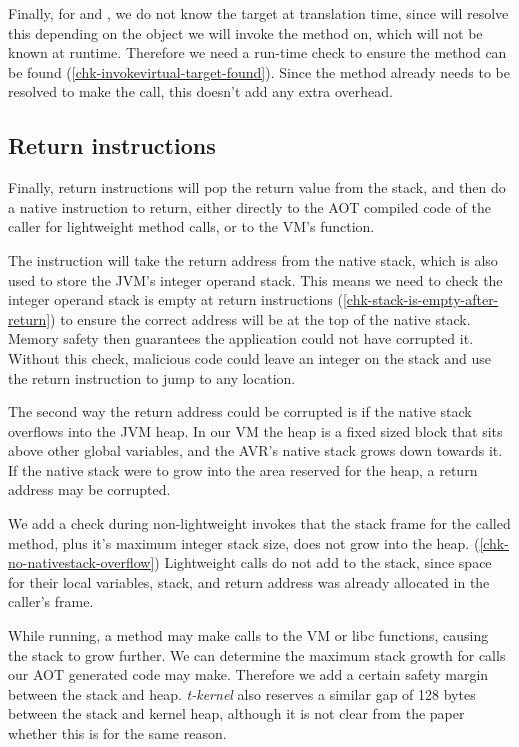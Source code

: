Finally, for  and , we do not know the target at translation time, since  will resolve this depending on the object we will invoke the method on, which will not be known at runtime. Therefore we need a run-time check to ensure the method can be found (\ref{chk-invokevirtual-target-found}). Since the method already needs to be resolved to make the call, this doesn't add any extra overhead.

\subsection{Return instructions}
Finally, return instructions will pop the return value from the stack, and then do a native  instruction to return, either directly to the AOT compiled code of the caller for lightweight method calls, or to the VM's  function.

The  instruction will take the return address from the native stack, which is also used to store the JVM's integer operand stack. This means we need to check the integer operand stack is empty at return instructions (\ref{chk-stack-is-empty-after-return}) to ensure the correct address will be at the top of the native stack. Memory safety then guarantees the application could not have corrupted it. Without this check, malicious code could leave an integer on the stack and use the return instruction to jump to any location.

The second way the return address could be corrupted is if the native stack overflows into the JVM heap. In our VM the heap is a fixed sized block that sits above other global variables, and the AVR's native stack grows down towards it. If the native stack were to grow into the area reserved for the heap, a return address may be corrupted.

We add a check during non-lightweight invokes that the stack frame for the called method, plus it's maximum integer stack size, does not grow into the heap. (\ref{chk-no-nativestack-overflow}) Lightweight calls do not add to the stack, since space for their local variables, stack, and return address was already allocated in the caller's frame.

While running, a method may make calls to the VM or libc functions, causing the stack to grow further. We can determine the maximum stack growth for calls our AOT generated code may make. Therefore we add a certain safety margin between the stack and heap. \emph{t-kernel} \cite{Gu:2005un} also reserves a similar gap of 128 bytes between the stack and kernel heap, although it is not clear from the paper whether this is for the same reason.

